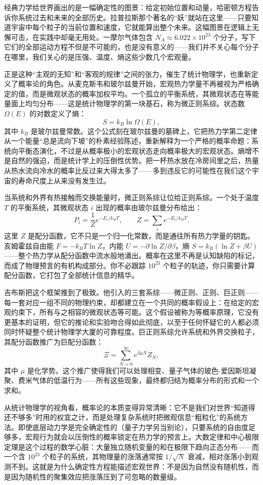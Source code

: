 \documentclass[UTF8]{ctexbook}
\begin{document}
经典力学给世界画出的是一幅确定性的图景：给定初始位置和动量，哈密顿方程告诉你系统过去和未来的全部历史。拉普拉斯那个著名的“妖”就站在这里——只要知道宇宙中每个粒子的当前位置和速度，它就能算出整个未来。这幅图景在逻辑上无懈可击，在实践中却毫无用处。一摩尔气体包含 $N_A\approx 6.022\times 10^{23}$ 个分子，写下它们的全部运动方程不但是不可能的，也是没有意义的——我们并不关心每个分子在哪里，我们关心的是压强、温度、熵这些少数几个宏观量。

正是这种“主观的无知”和“客观的规律”之间的张力，催生了统计物理学，也重新定义了概率论的角色。从麦克斯韦和玻尔兹曼开始，宏观热力学量不再被视为严格确定的值，而是微观状态的概率加权平均。一个孤立的平衡系统，其微观状态在等能量面上均匀分布——这是统计物理学的第一块基石，称为微正则系综。状态数 $\Omega(E)$ 的对数定义了熵：
\[
S=k_B\ln\Omega(E),
\]
其中 $k_B$ 是玻尔兹曼常数。这个公式刻在玻尔兹曼的墓碑上，它把热力学第二定律从一个能量“总是流向下坡”的朴素经验陈述，重新解释为一个严格的概率命题：系统向平衡态演化，不过是从概率极小的宏观状态走向概率极大的宏观状态。熵增不是自然的强迫，而是统计学上的压倒性优势。把一杯热水放在冷房间里之后，热量从热水流向冷水的概率比反过来大得太多了——多到违反它的可能性在我们这个宇宙的寿命尺度上从来没有发生过。

当系统和外界有热接触而交换能量时，微正则系综让位给正则系综。一个处于温度 $T$ 的平衡系统，其微观状态 $i$ 出现的概率由玻尔兹曼分布给出：
\[
P_i=\frac{1}{Z}e^{-E_i/k_BT},\qquad Z=\sum_i e^{-E_i/k_BT}.
\]
这里 $Z$ 是配分函数，它不只是一个归一化常数，而是通往所有热力学量的钥匙。亥姆霍兹自由能 $F=-k_BT\ln Z$，内能 $U=-\partial\ln Z/\partial\beta$，熵 $S=k_B(\ln Z+\beta U)$——整个热力学从配分函数中流水般地涌出。概率在这里不再是认知缺陷的标记，而成了物理预言的有机构成部分。你不必跟踪 $10^{23}$ 个粒子的轨迹，你只需要计算配分函数，它打包了全部统计信息的精华。

吉布斯把这个框架推到了极致。他引入的三套系综——微正则、正则、巨正则——每一套对应一组不同的物理约束，却都建立在一个共同的概率假设上：在给定的宏观约束下，所有与之相容的微观状态等可能。这个假设被称为等概率原理，它没有更基本的证明，但它的推论和实验吻合得如此彻底，以至于任何怀疑它的人都必须同时怀疑整个统计物理学大厦的可靠程度。巨正则系综允许系统和外界交换粒子，其配分函数推广为巨配分函数：
\[
\Xi=\sum_{N=0}^{\infty}e^{\beta\mu N}Z_N,
\]
其中 $\mu$ 是化学势。这个推广使得我们可以处理相变、量子气体的玻色-爱因斯坦凝聚、费米气体的低温行为——所有这些现象，最终都归结为概率分布的形式和一个求和。

从统计物理学的视角看，概率论的本质变得异常清晰：它不是我们对世界“知道得还不够多”时用的权宜之计，而是处理复杂系统时把微观信息“粗粒化”的系统方法。即使底层动力学是完全确定性的（量子力学另当别论），只要系统的自由度足够多，宏观行为就会以压倒性的概率锁定在热力学的预言上。大数定律和中心极限定理是这个过程的数学心脏：大量独立随机变量的和在极限下趋向正态分布——而一个含 $10^{23}$ 个粒子的系统，其物理量的涨落通常按 $1/\sqrt{N}$ 衰减，相对涨落小到观测不到。这就是为什么确定性方程能描述宏观世界：不是因为自然没有随机性，而是因为随机性的聚集效应把涨落压到了可忽略的数量级。
\end{document}

